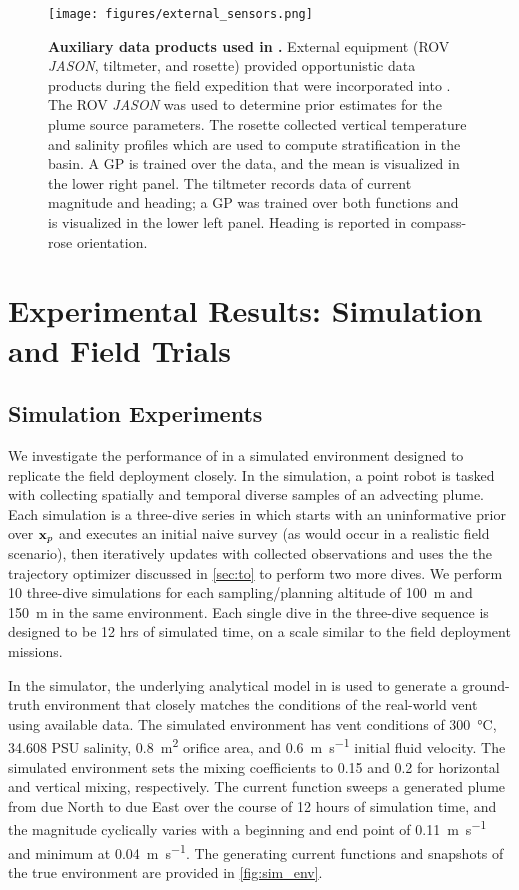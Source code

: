 \begin{figure}[h!]
    \centering
    \texttt{[image: figures/external\_sensors.png]}
    \caption{\textbf{Auxiliary data products used in \PHUMES.} External equipment (ROV \emph{JASON}, tiltmeter, and rosette) provided opportunistic data products during the field expedition that were incorporated into \PHUMES. The ROV \emph{JASON} was used to determine prior estimates for the plume source parameters. The rosette collected vertical temperature and salinity profiles which are used to compute stratification in the basin. A GP is trained over the data, and the mean is visualized in the lower right panel. The tiltmeter records data of current magnitude and heading; a GP was trained over both functions and is visualized in the lower left panel. Heading is reported in compass-rose orientation.}
    \label{fig:ext_sensors}
\end{figure}

\section{Experimental Results: Simulation and Field Trials}
\label{sec:experiments}

\subsection{Simulation Experiments}
We investigate the performance of \PHORTEX in a simulated environment designed to replicate the field deployment closely. In the simulation, a point robot is tasked with collecting spatially and temporal diverse samples of an advecting plume. Each simulation is a three-dive series in which \PHORTEX starts with an uninformative prior over $\mathbf{x}_p$ and executes an initial naive survey (as would occur in a realistic field scenario), then iteratively updates \PHORTEX with collected observations and uses the the trajectory optimizer discussed in \cref{sec:to} to perform two more dives. We perform 10 three-dive simulations for each sampling/planning altitude of \SI{100}{\meter} and \SI{150}{\meter} in the same environment. Each single dive in the three-dive sequence is designed to be 12 hrs of simulated time, on a scale similar to the field deployment missions. 

In the simulator, the underlying analytical model in \PHUMES is used to generate a ground-truth environment that closely matches the conditions of the real-world vent using available data. The simulated environment has vent conditions of \SI{300}{\celsius}, 34.608 PSU salinity, \SI{0.8}{\meter\squared} orifice area, and \SI{0.6}{\meter\per\second} initial fluid velocity. The simulated environment sets the mixing coefficients to 0.15 and 0.2 for horizontal and vertical mixing, respectively. The current function sweeps a generated plume from due North to due East over the course of 12 hours of simulation time, and the magnitude cyclically varies with a beginning and end point of \SI{0.11}{\meter\per\second} and minimum at \SI{0.04}{\meter\per\second}. The generating current functions and snapshots of the true environment are provided in \cref{fig:sim_env}.

